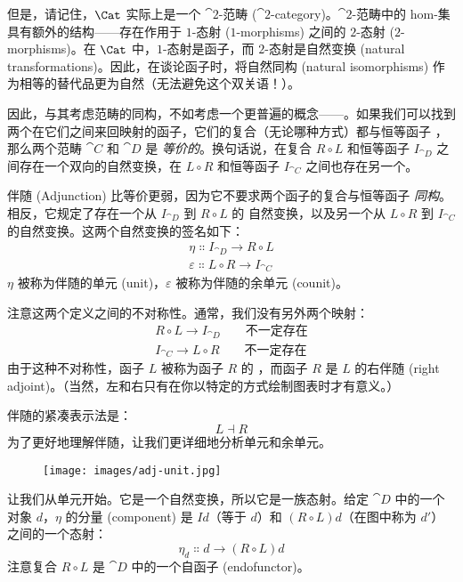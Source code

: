但是，请记住，$\Cat$ 实际上是一个 $\cat{2}$-范畴 ($\cat{2}$-category)。$\cat{2}$-范畴中的 hom-集具有额外的结构——存在作用于 $1$-态射 ($1$-morphisms) 之间的 $2$-态射 ($2$-morphisms)。在 $\Cat$ 中，$1$-态射是函子，而 $2$-态射是自然变换 (natural transformations)。因此，在谈论函子时，将自然同构 (natural isomorphisms) 作为相等的替代品更为自然（无法避免这个双关语！）。

因此，与其考虑范畴的同构，不如考虑一个更普遍的概念——。如果我们可以找到两个在它们之间来回映射的函子，它们的复合（无论哪种方式）都与恒等函子 ，那么两个范畴 $\cat{C}$ 和 $\cat{D}$ 是 \emph{等价的}。换句话说，在复合 $R \circ L$ 和恒等函子 $I_{\cat{D}}$ 之间存在一个双向的自然变换，在 $L \circ R$ 和恒等函子 $I_{\cat{C}}$ 之间也存在另一个。

伴随 (Adjunction) 比等价更弱，因为它不要求两个函子的复合与恒等函子 \emph{同构}。相反，它规定了存在一个从 $I_{\cat{D}}$ 到 $R \circ L$ 的  自然变换，以及另一个从 $L \circ R$ 到 $I_{\cat{C}}$ 的自然变换。这两个自然变换的签名如下：
\begin{gather*}
  \eta \Colon I_{\cat{D}} \to R \circ L \\
  \varepsilon \Colon L \circ R \to I_{\cat{C}}
\end{gather*}
$\eta$ 被称为伴随的单元 (unit)，$\varepsilon$ 被称为伴随的余单元 (counit)。

注意这两个定义之间的不对称性。通常，我们没有另外两个映射：
\begin{gather*}
  R \circ L \to I_{\cat{D}} \quad\quad\text{不一定存在} \\
  I_{\cat{C}} \to L \circ R \quad\quad\text{不一定存在}
\end{gather*}
由于这种不对称性，函子 $L$ 被称为函子 $R$ 的 ，而函子 $R$ 是 $L$ 的右伴随 (right adjoint)。（当然，左和右只有在你以特定的方式绘制图表时才有意义。）

伴随的紧凑表示法是：
\[L \dashv R\]
为了更好地理解伴随，让我们更详细地分析单元和余单元。

\begin{figure}[H]
  \centering
  \texttt{[image: images/adj-unit.jpg]}
\end{figure}

\noindent
让我们从单元开始。它是一个自然变换，所以它是一族态射。给定 $\cat{D}$ 中的一个对象 $d$，$\eta$ 的分量 (component) 是 $I d$（等于 $d$）和 $(R \circ L) d$（在图中称为 $d'$）之间的一个态射：
\[\eta_d \Colon d \to (R \circ L) d\]
注意复合 $R \circ L$ 是 $\cat{D}$ 中的一个自函子 (endofunctor)。

